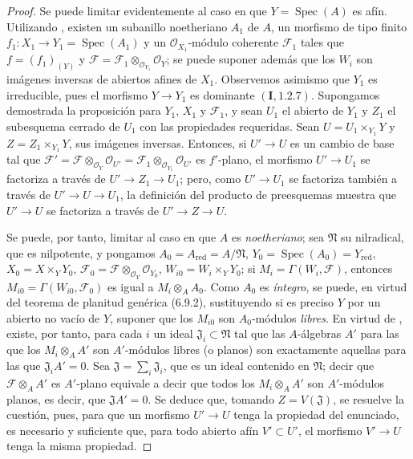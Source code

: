 \begin{proof}
Se puede limitar evidentemente al caso en que $Y=\operatorname{Spec}(A)$ es afín. Utilizando
, existen un subanillo noetheriano $A_1$ de $A$, un morfismo de tipo finito
$f_1:X_1\to Y_1=\operatorname{Spec}(A_1)$ y un $\mathcal O_{X_1}$-módulo coherente $\mathcal F_1$ tales que $f=(f_1)_{(Y)}$ y $\mathcal F=\mathcal F_1\otimes_{\mathcal O_{Y_1}}\mathcal O_Y$;
se puede suponer además que los $W_i$ son imágenes inversas de abiertos afines de $X_1$.
Observemos asimismo que $Y_1$ es irreducible, pues el morfismo $Y\to Y_1$ es dominante $(\mathbf I,1.2.7)$.
Supongamos demostrada la proposición para $Y_1$, $X_1$ y $\mathcal F_1$, y sean $U_1$ el abierto de $Y_1$ y $Z_1$ el
subesquema cerrado de $U_1$ con las propiedades requeridas. Sean $U=U_1\times_{Y_1}Y$ y $Z=Z_1\times_{Y_1}Y$, sus imágenes inversas. Entonces, si $U'\to U$ es un cambio de base
tal que $\mathcal F'=\mathcal F\otimes_{\mathcal O_Y}\mathcal O_{U'}
=\mathcal F_1\otimes_{\mathcal O_{Y_1}}\mathcal O_{U'}$ es $f'$-plano, el morfismo $U'\to U_1$ se factoriza
a través de $U'\to Z_1\to U_1$; pero, como $U'\to U_1$ se factoriza también a través de $U'\to U\to U_1$, la definición
del producto de preesquemas muestra que $U'\to U$ se factoriza a través de $U'\to Z\to U$.

Se puede, por tanto, limitar al caso en que $A$ es \emph{noetheriano}; sea $\mathfrak N$ su nilradical, que es
nilpotente, y pongamos $A_0=A_{\mathrm{red}}=A/\mathfrak N$, $Y_0=\operatorname{Spec}(A_0)=Y_{\mathrm{red}}$, $X_0=X\times_YY_0$, $\mathcal F_0=\mathcal F\otimes_{\mathcal O_Y}
\mathcal O_{Y_0}$,
$W_{i0}=W_i\times_YY_0$; si $M_i=\Gamma(W_i,\mathcal F)$, entonces $M_{i0}=\Gamma(W_{i0},\mathcal F_0)$ es igual a $M_i\otimes_A A_0$.
Como $A_0$ es \emph{íntegro}, se puede, en virtud del teorema de planitud genérica (6.9.2),
sustituyendo si es preciso $Y$ por un abierto no vacío de $Y$, suponer que los $M_{i0}$ son
$A_0$-módulos \emph{libres}. En virtud de , existe, por tanto, para cada $i$ un ideal $\mathfrak J_i\subset\mathfrak N$ tal
que las $A$-álgebras $A'$ para las que los $M_i\otimes_A A'$ son $A'$-módulos libres (o planos)
son exactamente aquellas para las que $\mathfrak J_iA'=0$. Sea $\mathfrak J=\sum_i\mathfrak J_i$, que es un ideal contenido
en $\mathfrak N$; decir que $\mathcal F\otimes_A A'$ es $A'$-plano equivale a decir que todos los $M_i\otimes_A A'$ son
$A'$-módulos planos, es decir, que $\mathfrak JA'=0$. Se deduce que, tomando $Z=V(\mathfrak J)$, se
resuelve la cuestión, pues, para que un morfismo $U'\to U$ tenga la propiedad del enunciado,
es necesario y suficiente que, para todo abierto afín $V'\subset U'$, el morfismo $V'\to U$
tenga la misma propiedad.
\end{proof}

